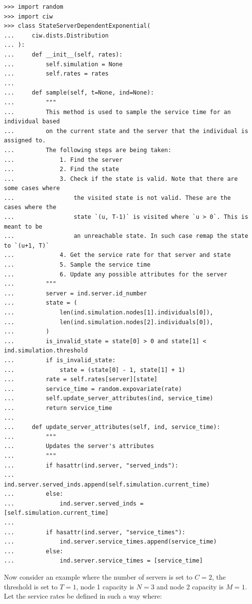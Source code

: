 \begin{lstlisting}[style=pystyle]
>>> import random
>>> import ciw
>>> class StateServerDependentExponential(
...     ciw.dists.Distribution
... ):
...     def __init__(self, rates):
...         self.simulation = None
...         self.rates = rates
... 
...     def sample(self, t=None, ind=None):
...         """
...         This method is used to sample the service time for an individual based
...         on the current state and the server that the individual is assigned to.
...         The following steps are being taken:
...             1. Find the server
...             2. Find the state
...             3. Check if the state is valid. Note that there are some cases where
...                 the visited state is not valid. These are the cases where the
...                 state `(u, T-1)` is visited where `u > 0`. This is meant to be
...                 an unreachable state. In such case remap the state to `(u+1, T)`
...             4. Get the service rate for that server and state
...             5. Sample the service time
...             6. Update any possible attributes for the server
...         """
...         server = ind.server.id_number
...         state = (
...             len(ind.simulation.nodes[1].individuals[0]),
...             len(ind.simulation.nodes[2].individuals[0]),
...         )
...         is_invalid_state = state[0] > 0 and state[1] < ind.simulation.threshold
...         if is_invalid_state:
...             state = (state[0] - 1, state[1] + 1)
...         rate = self.rates[server][state]
...         service_time = random.expovariate(rate)
...         self.update_server_attributes(ind, service_time)
...         return service_time
... 
...     def update_server_attributes(self, ind, service_time):
...         """
...         Updates the server's attributes
...         """
...         if hasattr(ind.server, "served_inds"):
...             ind.server.served_inds.append(self.simulation.current_time)
...         else:
...             ind.server.served_inds = [self.simulation.current_time]
... 
...         if hasattr(ind.server, "service_times"):
...             ind.server.service_times.append(service_time)
...         else:
...             ind.server.service_times = [service_time]

\end{lstlisting}

Now consider an example where the number of servers is set to \(C = 2\), the
threshold is set to \(T = 1\), node 1 capacity is \(N = 3\) and node 2 capacity
is \(M = 1\).
Let the service rates be defined in such a way where:

